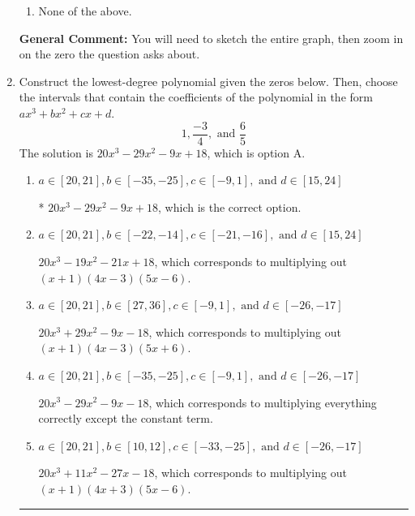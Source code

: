 \documentclass{extbook}[14pt]
\newcommand{\litem}[1]{\item #1

\rule{\textwidth}{0.4pt}}
\begin{document}
\begin{enumerate}
{\begin{enumerate}[label=\Alph*.]
\item None of the above.\end{enumerate}
\textbf{General Comment:} You will need to sketch the entire graph, then zoom in on the zero the question asks about.
}
\litem{
Construct the lowest-degree polynomial given the zeros below. Then, choose the intervals that contain the coefficients of the polynomial in the form $ax^3+bx^2+cx+d$.
\[ 1, \frac{-3}{4}, \text{ and } \frac{6}{5} \]The solution is \( 20x^{3} -29 x^{2} -9 x + 18 \), which is option A.\begin{enumerate}[label=\Alph*.]
\item \( a \in [20, 21], b \in [-35, -25], c \in [-9, 1], \text{ and } d \in [15, 24] \)

* $20x^{3} -29 x^{2} -9 x + 18$, which is the correct option.
\item \( a \in [20, 21], b \in [-22, -14], c \in [-21, -16], \text{ and } d \in [15, 24] \)

$20x^{3} -19 x^{2} -21 x + 18$, which corresponds to multiplying out $(x + 1)(4x -3)(5x -6)$.
\item \( a \in [20, 21], b \in [27, 36], c \in [-9, 1], \text{ and } d \in [-26, -17] \)

$20x^{3} +29 x^{2} -9 x -18$, which corresponds to multiplying out $(x + 1)(4x -3)(5x + 6)$.
\item \( a \in [20, 21], b \in [-35, -25], c \in [-9, 1], \text{ and } d \in [-26, -17] \)

$20x^{3} -29 x^{2} -9 x -18$, which corresponds to multiplying everything correctly except the constant term.
\item \( a \in [20, 21], b \in [10, 12], c \in [-33, -25], \text{ and } d \in [-26, -17] \)

$20x^{3} +11 x^{2} -27 x -18$, which corresponds to multiplying out $(x + 1)(4x + 3)(5x -6)$.
\end{enumerate}

}
\end{enumerate}
\end{document}
